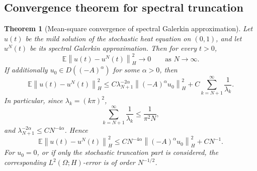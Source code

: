 \documentclass[11pt,a4paper]{article}
\newtheorem{theorem}{Theorem}[section]
\newcommand{\E}{\mathbb{E}}
\newcommand{\norm}[1]{\left\lVert #1 \right\rVert}
\newcommand{\dom}{D}
\begin{document}
\subsection{Convergence theorem for spectral truncation}

\begin{theorem}[Mean-square convergence of spectral Galerkin approximation]
Let \(u(t)\) be the mild solution of the stochastic heat equation on \((0,1)\),
and let \(u^N(t)\) be its spectral Galerkin approximation. Then for every
\(t>0\),
\[
  \E\norm{u(t)-u^N(t)}_H^2\longrightarrow0
  \qquad\text{as }N\to\infty.
\]
If additionally \(u_0\in\dom((-A)^\alpha)\) for some \(\alpha>0\), then
\[
  \E\norm{u(t)-u^N(t)}_H^2
  \le
  C\lambda_{N+1}^{-2\alpha}\norm{(-A)^\alpha u_0}_H^2
  +
  C\sum_{k=N+1}^{\infty}\frac1{\lambda_k}.
\]
In particular, since \(\lambda_k=(k\pi)^2\),
\[
  \sum_{k=N+1}^{\infty}\frac1{\lambda_k}
  \le
  \frac{1}{\pi^2N},
\]
and \(\lambda_{N+1}^{-2\alpha}\le C N^{-4\alpha}\). Hence
\[
  \E\norm{u(t)-u^N(t)}_H^2
  \le
  C N^{-4\alpha}\norm{(-A)^\alpha u_0}_H^2
  +
  C N^{-1}.
\]
For \(u_0=0\), or if only the stochastic truncation part is considered, the
corresponding \(L^2(\Omega;H)\)-error is of order \(N^{-1/2}\).
\end{theorem}
\end{document}

